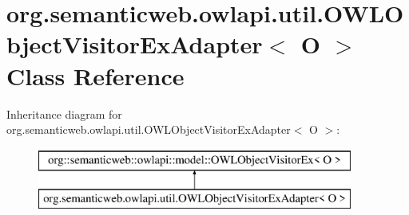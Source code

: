 \hypertarget{classorg_1_1semanticweb_1_1owlapi_1_1util_1_1_o_w_l_object_visitor_ex_adapter_3_01_o_01_4}{\section{org.\-semanticweb.\-owlapi.\-util.\-O\-W\-L\-Object\-Visitor\-Ex\-Adapter$<$ O $>$ Class Reference}
\label{classorg_1_1semanticweb_1_1owlapi_1_1util_1_1_o_w_l_object_visitor_ex_adapter_3_01_o_01_4}
}
Inheritance diagram for org.\-semanticweb.\-owlapi.\-util.\-O\-W\-L\-Object\-Visitor\-Ex\-Adapter$<$ O $>$\-:\begin{figure}[H]
\begin{center}
\leavevmode
\includegraphics[height=2.000000cm]{classorg_1_1semanticweb_1_1owlapi_1_1util_1_1_o_w_l_object_visitor_ex_adapter_3_01_o_01_4}
\end{center}
\end{figure}
